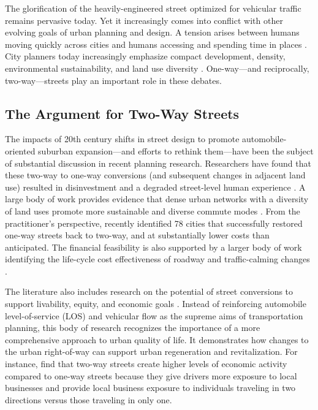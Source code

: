 \documentclass{trbunofficial}
\begin{document}
The glorification of the heavily-engineered street optimized for vehicular traffic remains pervasive today. Yet it increasingly comes into conflict with other evolving goals of urban planning and design. A tension arises between humans moving quickly across cities and humans accessing and spending time in places \cite{hebbert_engineering_2005}. City planners today increasingly emphasize compact development, density, environmental sustainability, and land use diversity \cite{stevens_does_2017,salon_how_2012}. One-way---and reciprocally, two-way---streets play an important role in these debates.

\subsection{The Argument for Two-Way Streets}

The impacts of 20th century shifts in street design to promote automobile-oriented suburban expansion---and efforts to rethink them---have been the subject of substantial discussion in recent planning research. Researchers have found that these two-way to one-way conversions (and subsequent changes in adjacent land use) resulted in disinvestment and a degraded street-level human experience \cite{cervero_travel_1997,leinberger_walk_2012}. A large body of work provides evidence that dense urban networks with a diversity of land uses promote more sustainable and diverse commute modes \cite{ewing_travel_2010,frank_many_2006,frederick_commute_2018}. From the practitioner's perspective, \citet{speck_walkable_2018} recently identified 78 cities that successfully restored one-way streets back to two-way, and at substantially lower costs than anticipated. The financial feasibility is also supported by a larger body of work identifying the life-cycle cost effectiveness of roadway and traffic-calming changes \cite{noland_costs_2015}.

The literature also includes research on the potential of street conversions to support livability, equity, and economic goals \cite{riggs_two-way_2016,riggs_economic_2017, riggs_economic_2018}. Instead of reinforcing automobile level-of-service (LOS) and vehicular flow as the supreme aims of transportation planning, this body of research recognizes the importance of a more comprehensive approach to urban quality of life. It demonstrates how changes to the urban right-of-way can support urban regeneration and revitalization. For instance, \citet{riggs_two-way_2016} find that two-way streets create higher levels of economic activity compared to one-way streets because they give drivers more exposure to local businesses and provide local business exposure to individuals traveling in two directions versus those traveling in only one.
\end{document}
